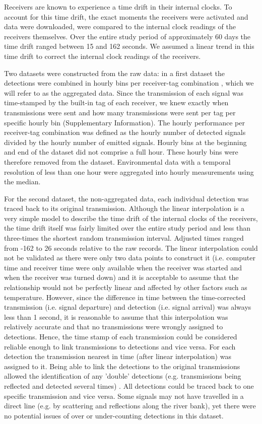 \documentclass[doublespacing,linenumbers]{bmcart}
\begin{document}
Receivers are known to experience a time drift in their internal clocks. To account for this time drift, the exact moments the receivers were activated and data were downloaded, were compared to the internal clock readings of the receivers themselves. Over the entire study period of approximately 60 days the time drift ranged between 15 and 162 seconds. We assumed a linear trend in this time drift to correct the internal clock readings of the receivers. 

Two datasets were constructed from the raw data: in a first dataset the detections were combined in hourly bins per receiver-tag combination \cite{Reubens2018,OBrien2021InfluenceBight}, which we will refer to as the aggregated data. Since the transmission of each signal was time-stamped by the built-in tag of each receiver, we knew exactly when transmissions were sent and how many transmissions were sent per tag per specific hourly bin (Supplementary Information). The hourly performance per receiver-tag combination was defined as the hourly number of detected signals divided by the hourly number of emitted signals. Hourly bins at the beginning and end of the dataset did not comprise a full hour. These hourly bins were therefore removed from the dataset. Environmental data with a temporal resolution of less than one hour were aggregated into hourly measurements using the median. 

For the second dataset, the non-aggregated data, each individual detection was traced back to its original transmission. Although the linear interpolation is a very simple model to describe the time drift of the internal clocks of the receivers, the time drift itself was fairly limited over the entire study period and less than three-times the shortest random transmission interval. Adjusted times ranged from -162 to 26 seconds relative to the raw records. The linear interpolation could not be validated as there were only two data points to construct it (i.e. computer time and receiver time were only available when the receiver was started and when the receiver was turned down) and it is acceptable to assume that the relationship would not be perfectly linear and affected by other factors such as temperature. However, since the difference in time between the time-corrected transmission (i.e. signal departure) and detection (i.e. signal arrival) was always less than 1 second, it is reasonable to assume that this interpolation was relatively accurate and that no transmissions were wrongly assigned to detections. Hence, the time stamp of each transmission could be considered reliable enough to link transmissions to detections and vice versa. For each detection the transmission nearest in time (after linear interpolation) was assigned to it. Being able to link the detections to the original transmissions allowed the identification of any 'double' detections (e.g. transmissions being reflected and detected several times) \cite{Simpfendorfer2015GhostsEquipment}. All detections could be traced back to one specific transmission and vice versa. Some signals may not have travelled in a direct line (e.g. by scattering and reflections along the river bank), yet there were no potential issues of over or under-counting detections in this dataset. 
\end{document}
